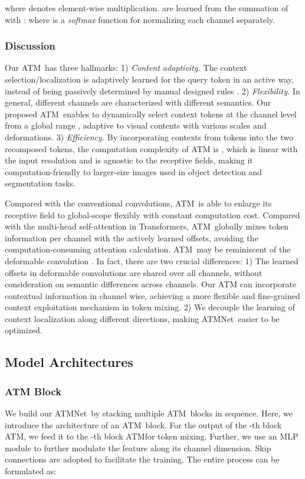 \documentclass[letterpaper]{article} \usepackage{aaai23v}  \usepackage{times}  \usepackage{helvet}  \usepackage{courier}  \usepackage[hyphens]{url}  \usepackage{graphicx} \urlstyle{rm} \def\UrlFont{\rm}  \usepackage{caption} \frenchspacing  \setlength{\pdfpagewidth}{8.5in}  \setlength{\pdfpageheight}{11in}  \usepackage{algorithm}
\newcommand{\ours}{{ATMNet}}
\newcommand{\ourcore}{{ATM}}
\newcommand{\ourop}{{ATM}}
\begin{document}
where  denotes element-wise multiplication.  are learned from the summation  of  
with 
: 
where  is a \textit{softmax} function for normalizing each channel separately. 




\subsubsection{Discussion}
Our \ourcore~has three hallmarks: 
1) \textit{Content adaptivity.} The context selection/localization 
is adaptively learned for the query token in an active way, instead of being passively determined by manual designed rules \cite{chen2022cyclemlp,lian2021asmlp,yu2022s2MLP,zhang2021morphmlp}.
2) \textit{Flexibility.} In general, different channels are characterized with different semantics. Our proposed \ourop~enables to dynamically select context tokens at the channel level from a global range , adaptive to visual contents with various scales and deformations.
3) \textit{Efficiency.} 
By incorporating contexts from  tokens into the two recomposed tokens, 
the computation complexity of ATM is , which is linear with the input resolution and is agnostic to the receptive fields, making it computation-friendly to larger-size images used in object detection and segmentation tasks. 


Compared with the conventional convolutions, 
\ourcore~is able to enlarge its receptive field to global-scope flexibly with constant computation cost. Compared with the multi-head self-attention in Transformers, \ourcore~globally mixes token information per channel with the actively learned offsets, avoiding the computation-consuming attention calculation. 
\ourcore~may be reminiscent of the deformable convolution \cite{dai2017deformabledcn,zhu2019DCNV2}. In fact, there are two crucial differences: 1) The learned offsets in deformable convolutions are shared over all channels, without consideration on semantic differences across channels.
Our ATM can incorporate contextual information in channel wise, achieving a more flexible and fine-grained context exploitation mechanism in token mixing.
2) We decouple the learning of context localization along different directions, 
making \ours~easier to be optimized. 


\subsection{Model Architectures}
\noindent
\subsubsection{ATM Block}
We build our \ours~by stacking multiple \ourop~blocks in sequence. 
Here, we introduce the architecture of an \ourop~block. 
For the output  of the -th block \ourop, we feed it to the -th block \ourop for token mixing. 
Further, we use an MLP module to further modulate the feature along its channel dimension. Skip connections are adopted to facilitate the training. The entire process can be formulated as:
\end{document}
